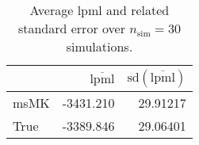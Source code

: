 \begin{table}[H]

\caption{Average lpml and related standard error over $n_{\text{sim}} = 30$ simulations.}
\centering
\begin{tabular}[t]{lrr}
\toprule
  & $\overbar{\text{lpml}}$ & $\text{sd}(\overbar{\text{lpml}})$\\
\midrule
msMK & -3431.210 & 29.91217\\
True & -3389.846 & 29.06401\\
\bottomrule
\end{tabular}
\end{table}
